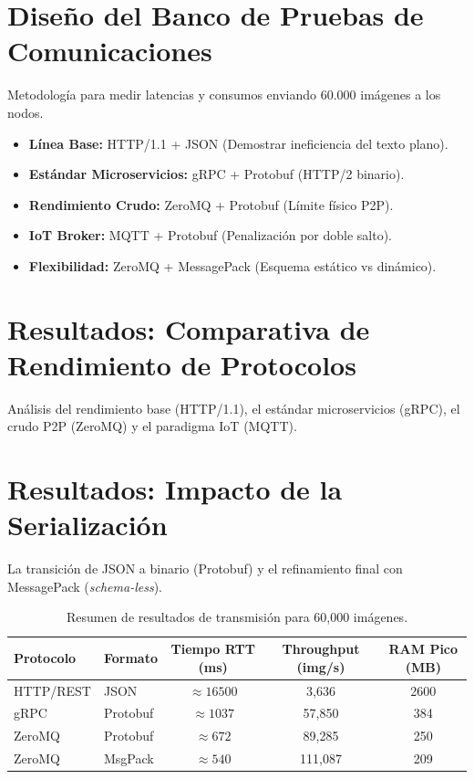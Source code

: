 \documentclass[11pt, a4paper]{report}
\begin{document}
\section{Diseño del Banco de Pruebas de Comunicaciones}
Metodología para medir latencias y consumos enviando 60.000 imágenes a los nodos.

\begin{itemize}
    \item \textbf{Línea Base:} HTTP/1.1 + JSON (Demostrar ineficiencia del texto plano).
    \item \textbf{Estándar Microservicios:} gRPC + Protobuf (HTTP/2 binario).
    \item \textbf{Rendimiento Crudo:} ZeroMQ + Protobuf (Límite físico P2P).
    \item \textbf{IoT Broker:} MQTT + Protobuf (Penalización por doble salto).
    \item \textbf{Flexibilidad:} ZeroMQ + MessagePack (Esquema estático vs dinámico).
\end{itemize}

\section{Resultados: Comparativa de Rendimiento de Protocolos}
Análisis del rendimiento base (HTTP/1.1), el estándar microservicios (gRPC), el crudo P2P (ZeroMQ) y el paradigma IoT (MQTT).

\section{Resultados: Impacto de la Serialización}
La transición de JSON a binario (Protobuf) y el refinamiento final con MessagePack (\textit{schema-less}).

\begin{table}[htbp]
    \centering
    \begin{tabular}{llccc}
        \toprule
        \textbf{Protocolo} & \textbf{Formato} & \textbf{Tiempo RTT (ms)} & \textbf{Throughput (img/s)} & \textbf{RAM Pico (MB)} \\
        \midrule
        HTTP/REST & JSON & $\approx 16500$ & 3,636 & 2600 \\
        gRPC & Protobuf & $\approx 1037$ & 57,850 & 384 \\
        ZeroMQ & Protobuf & $\approx 672$ & 89,285 & 250 \\
        ZeroMQ & MsgPack & $\approx 540$ & 111,087 & 209 \\
        \bottomrule
    \end{tabular}
    \caption{Resumen de resultados de transmisión para 60,000 imágenes.}
    \label{tab:resultados_red}
\end{table}
\end{document}
